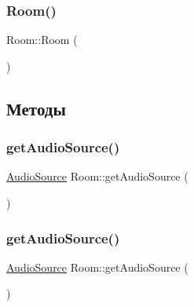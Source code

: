 \mbox{\label{class_room_ac6ef93a7d9c3e1d624e025058d5f16ff}} 
\subsubsection{\texorpdfstring{Room()}{Room()}\hspace{0.1cm}{\footnotesize\ttfamily [4/4]}}
{\footnotesize\ttfamily Room\+::\+Room (\begin{DoxyParamCaption}{ }\end{DoxyParamCaption})\hspace{0.3cm}{\ttfamily [inline]}}



\subsection{Методы}
\mbox{\label{class_room_ad99b6c39b3322dc0f28ce31c35402bb9}} 
\subsubsection{\texorpdfstring{get\+Audio\+Source()}{getAudioSource()}\hspace{0.1cm}{\footnotesize\ttfamily [1/2]}}
{\footnotesize\ttfamily \hyperlink{struct_audio_source}{Audio\+Source} Room\+::get\+Audio\+Source (\begin{DoxyParamCaption}{ }\end{DoxyParamCaption})\hspace{0.3cm}{\ttfamily [inline]}}

\mbox{\label{class_room_ad99b6c39b3322dc0f28ce31c35402bb9}} 
\subsubsection{\texorpdfstring{get\+Audio\+Source()}{getAudioSource()}\hspace{0.1cm}{\footnotesize\ttfamily [2/2]}}
{\footnotesize\ttfamily \hyperlink{struct_audio_source}{Audio\+Source} Room\+::get\+Audio\+Source (\begin{DoxyParamCaption}{ }\end{DoxyParamCaption})\hspace{0.3cm}{\ttfamily [inline]}}

